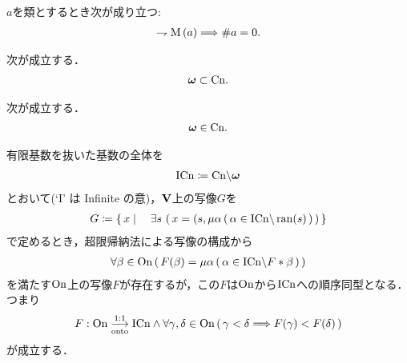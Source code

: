 	
	\begin{screen}
		\begin{thm}[真類の濃度は$0$]
			$a$を類とするとき次が成り立つ:
			\begin{align}
				\rightharpoondown \operatorname*{M}\left(a\right) \Longrightarrow \# a = 0.
			\end{align}
		\end{thm}
	\end{screen}
	
	\begin{screen}
		\begin{thm}[自然数は基数]
			次が成立する．
			\begin{align}
				{\boldsymbol \omega} \subset \mathrm{Cn}.
			\end{align}
		\end{thm}
	\end{screen}
	
	\begin{screen}
		\begin{thm}[$\omg$は基数]
			次が成立する．
			\begin{align}
				{\boldsymbol \omega} \in \mathrm{Cn}.
			\end{align}
		\end{thm}
	\end{screen}
	
	\begin{screen}
		\begin{thm}
			有限基数を抜いた基数の全体を
			\begin{align}
				\mathrm{ICn} \coloneqq \mathrm{Cn} \backslash {\boldsymbol \omega}
			\end{align}
			とおいて(`I' は Infinite の意)，$\mathbf{V}$上の写像$G$を
			\begin{align}
				G \coloneqq \left\{\, x \mid \quad \exists s\, \left(\, x=(s,\mu \alpha\, (\, \alpha \in \mathrm{ICn} \backslash \operatorname*{ran}(s)\, )\, \right)\, \right\}
			\end{align}
			で定めるとき，超限帰納法による写像の構成から
			\begin{align}
				\forall \beta \in \mathrm{On}\, (\, F(\beta) = \mu \alpha\, (\, \alpha \in \mathrm{ICn} \backslash F \ast \beta\, )\, )
			\end{align}
			を満たす$\mathrm{On}$上の写像$F$が存在するが，この$F$は$\mathrm{On}$から$\mathrm{ICn}$への順序同型となる．つまり
			\begin{align}
				F:\mathrm{On} \underset{\mathrm{onto}}{\overset{\mathrm{1:1}}{\longrightarrow}} \mathrm{ICn} \wedge \forall \gamma, \delta \in \mathrm{On}\, (\, \gamma < \delta
				\Longrightarrow F(\gamma) < F(\delta)\, )
			\end{align}
			が成立する．
		\end{thm}
	\end{screen}
	
